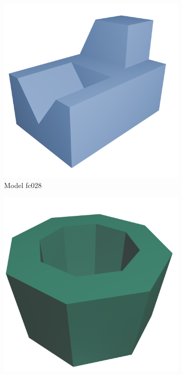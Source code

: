 \begin{figure}[htb]
\centering
\begin{subfigure}{0.3\textwidth}
	\includegraphics[width=\textwidth]{../resources/models/fc028.png}
	\caption{Model fc028}
\end{subfigure}
\hfill
\begin{subfigure}{0.3\textwidth}
	\includegraphics[width=\textwidth]{../resources/models/1505020.png}

\end{subfigure}
\end{figure}
